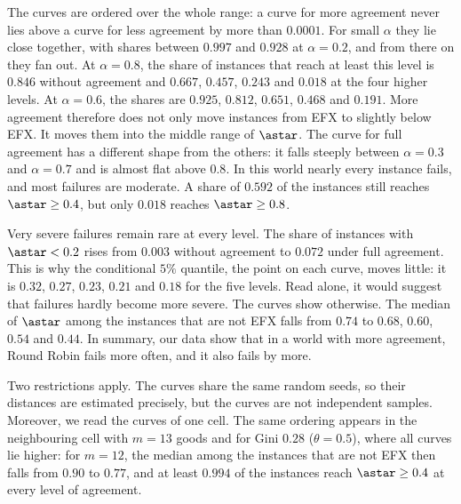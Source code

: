 The curves are ordered over the whole range: a curve for more agreement never lies above a curve
for less agreement by more than $0.0001$. For small $\alpha$ they lie close together, with
shares between $0.997$ and $0.928$ at $\alpha=0.2$, and from there on they fan out. At $\alpha=0.8$, the share of instances that reach at least this
level is $0.846$ without agreement and $0.667$, $0.457$, $0.243$ and $0.018$ at the four higher
levels. At $\alpha=0.6$, the shares are $0.925$, $0.812$, $0.651$, $0.468$ and $0.191$. More
agreement therefore does not only move instances from EFX to slightly below EFX. It moves them
into the middle range of $\astar$. The curve for full agreement has a different shape from the
others: it falls steeply between $\alpha=0.3$ and $\alpha=0.7$ and is almost flat above $0.8$.
In this world nearly every instance fails, and most failures are moderate. A share of $0.592$ of
the instances still reaches $\astar\geq0.4$, but only $0.018$ reaches $\astar\geq0.8$.

Very severe failures remain rare at every level. The share of instances with $\astar<0.2$ rises
from $0.003$ without agreement to $0.072$ under full agreement. This is why the conditional
$5\%$ quantile, the point on each curve, moves little: it is $0.32$, $0.27$, $0.23$, $0.21$ and
$0.18$ for the five levels. Read alone, it would suggest that failures hardly become more severe.
The curves show otherwise. The median of $\astar$ among the instances that are not EFX falls
from $0.74$ to $0.68$, $0.60$, $0.54$ and $0.44$. In summary, our data show that in a world with more
agreement, Round Robin fails more often, and it also fails by more.

Two restrictions apply. The curves share the same random seeds, so their distances are estimated
precisely, but the curves are not independent samples. Moreover, we read the curves of one cell.
The same ordering appears in the neighbouring cell with $m=13$ goods and for Gini $0.28$
($\theta=0.5$), where all curves lie higher: for $m=12$, the median among the instances that are
not EFX then falls from $0.90$ to $0.77$, and at least $0.994$ of the instances reach
$\astar\geq0.4$ at every level of agreement.

